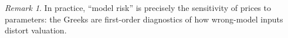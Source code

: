 \documentclass[11pt]{article}
\theoremstyle{definition}
\theoremstyle{remark}
\newtheorem{remark}[theorem]{Remark}
\newcommand{\R}{\mathbb{R}}
\newcommand{\1}{\mathbf{1}}
\newcommand{\dd}{\,\mathrm{d}}
\theoremstyle{definition}
\begin{document}
\begin{remark}
In practice, ``model risk'' is precisely the sensitivity of prices to parameters:
the Greeks are first-order diagnostics of how wrong-model inputs distort valuation.
\end{remark}









\end{document}
